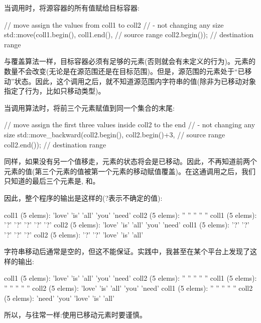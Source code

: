 当调用时，将源容器的所有值赋给目标容器:

\begin{cppcode}
// move assign the values from coll1 to coll2
// - not changing any size
std::move(coll1.begin(), coll1.end(), // source range
		  coll2.begin()); // destination range
\end{cppcode}

与覆盖算法一样，目标容器必须有足够的元素(否则就会有未定义的行为)。元素的数量不会改变(无论是在源范围还是在目标范围)。但是，源范围的元素处于“已移动”状态。因此，这个调用之后，就不知道源范围内字符串的值(除非为已移动对象指定了行为，比如只移动类型)。

当调用算法时，将前三个元素赋值到同一个集合的末尾:

\begin{cppcode}
// move assign the first three values inside coll2 to the end
// - not changing any size
std::move_backward(coll2.begin(), coll2.begin()+3, // source range
				   coll2.end()); // destination range
\end{cppcode}

同样，如果没有另一个值移走，元素的状态将会是已移动。因此，不再知道前两个元素的值(第三个元素的值被第一个元素的移动赋值覆盖)。在这通调用之后，我们只知道的最后三个元素是, 和。

因此，整个程序的输出是这样的(?表示不确定的值):

\begin{outputcode}
coll1 (5 elems): 'love' 'is' 'all' 'you' 'need'
coll2 (5 elems): '' '' '' '' ''
coll1 (5 elems): '?' '?' '?' '?' '?'
coll2 (5 elems): 'love' 'is' 'all' 'you' 'need'
coll1 (5 elems): '?' '?' '?' '?' '?'
coll2 (5 elems): '?' '?' 'love' 'is' 'all'
\end{outputcode}

字符串移动后通常是空的，但这不能保证。实践中，我甚至在某个平台上发现了这样的输出:

\begin{outputcode}
coll1 (5 elems): 'love' 'is' 'all' 'you' 'need'
coll2 (5 elems): '' '' '' '' ''
coll1 (5 elems): '' '' '' '' ''
coll2 (5 elems): 'love' 'is' 'all' 'you' 'need'
coll1 (5 elems): '' '' '' '' ''
coll2 (5 elems): 'need' 'you' 'love' 'is' 'all'
\end{outputcode}


所以，与往常一样:使用已移动元素时要谨慎。

